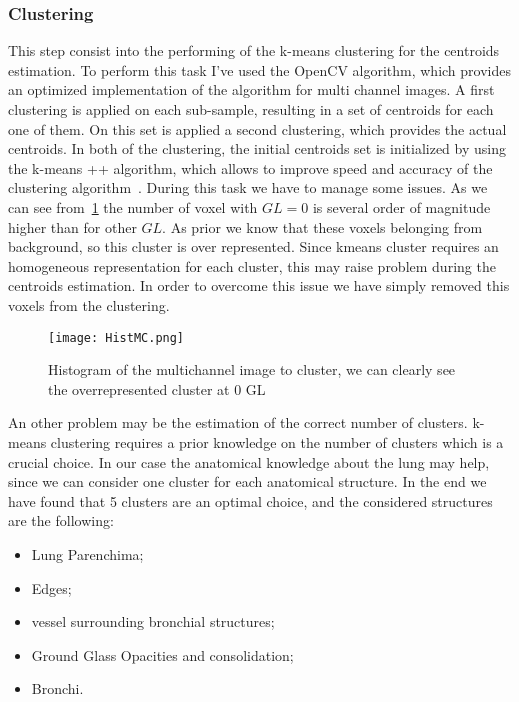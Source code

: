 		
		\subsubsection*{Clustering} 
		
		This step consist into the performing of the k-means clustering for the centroids estimation. To perform this task I've used the OpenCV algorithm, which provides an optimized implementation of the algorithm for multi channel images. A first clustering is applied on each sub-sample, resulting in a set of centroids for each one of them. On this set is applied a second clustering, which provides the actual centroids. In both of the clustering, the initial centroids set is initialized by using the k-means ++ algorithm, which allows to improve speed and accuracy of the clustering algorithm~\cite{Arthur2007}.
		During this task we have to manage some issues. As we can see from \figurename\,\ref{fig:ClusteringHistogram} the number of voxel with $GL = 0$  is several order of magnitude higher than for other $GL$. As prior we know that these voxels belonging from background, so this cluster is over represented. Since kmeans cluster requires an homogeneous representation for each cluster, this may raise problem during the centroids estimation. In order to overcome this issue we have simply removed this voxels from the clustering.  
		

		\begin{figure}[h!]
			\centering
				\texttt{[image: HistMC.png]}
				\caption{Histogram of the multichannel image to cluster, we can clearly see the overrepresented cluster at $0$ GL}	\label{fig:ClusteringHistogram}
		\end{figure}
		
	An other problem may be the estimation of the correct number of clusters. k-means clustering requires a prior knowledge on the number of clusters which is a crucial choice. In our case the anatomical knowledge about the lung may help, since we can consider one cluster for each anatomical structure. In the end we have found that 5 clusters are an optimal choice, and the considered structures are the following: 
	\begin{itemize}
		\item Lung Parenchima;
		
		\item Edges;
		
		\item vessel surrounding bronchial structures;
		
		\item Ground Glass Opacities and consolidation;
		
		\item Bronchi.

	\end{itemize}

